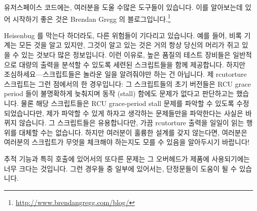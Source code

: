 유저스페이스 코드에는, 여러분을 도울 수많은 도구들이 있습니다.
이를 알아보는데 있어 시작하기 좋은 것은 Brendan Gregg 의
블로그입니다.\footnote{
	\url{http://www.brendangregg.com/blog/}}

Heisenbug 를 막는다 하더라도, 다른 위험들이 기다리고 있습니다.
예를 들어, 비록 기계는 모든 것을 알고 있지만, 그것이 알고 있는 것은 거의 항상
당신의 머리가 쥐고 있을 수 있는 것보다 많은 정보입니다.
이런 이유로, 높은 품질의 테스트 장비들은 일반적으로 대량의 출력을 분석할 수
있도록 세련된 스크립트들을 함께 제공합니다.
하지만 조심하세요---스크립트들은 놀라운 일을 알려줘야만 하는 건 아닙니다.
제 rcutorture 스크립트는 그런 점에서의 한 경우입니다: 그 스크립트들의 초기
버전들은 RCU grace period 들이 불명확하게 늦춰지며 동작 (stall) 함에도 문제가
없다고 판단하고는 했습니다.
물론 해당 스크립트들은 RCU grace-period stall 문제를 파악할 수 있도록
수정되었습니다만, 제가 파악할 수 있게 하자고 생각하는 문제들만을 파악한다는
사실은 바뀌지 않습니다.
그 스크립트들은 유용합니다만, 가끔 rcutorture 출력을 일일이 읽는 행위를 대체할
수는 없습니다.
하지만 여러분이 훌륭한 설계를 갖지 않는다면, 여러분은 여러분의 스크립트가
무엇을 체크해야 하는지도 모를 수 있음을 알아두시기 바랍니다!

추적 기능과 특히  호출에 있어서의 또다른 문제는 그 오버헤드가
제품에 사용되기에는 너무 크다는 것입니다.
그런 경우들 중 일부에 있어서는, 단정문들이 도움이 될 수 있습니다.

